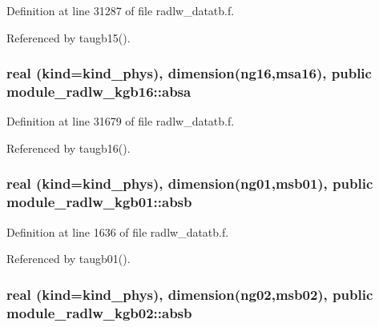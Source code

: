 Definition at line 31287 of file radlw\+\_\+datatb.\+f.



Referenced by taugb15().

\subsubsection[{\texorpdfstring{absa}{absa}}]{\setlength{\rightskip}{0pt plus 5cm}real (kind=kind\+\_\+phys), dimension(ng16,msa16), public module\+\_\+radlw\+\_\+kgb16\+::absa}\hypertarget{group__module__radlw__main_ga2734b420b7e8e8393a8bf1b595a3cf09}{}\label{group__module__radlw__main_ga2734b420b7e8e8393a8bf1b595a3cf09}


Definition at line 31679 of file radlw\+\_\+datatb.\+f.



Referenced by taugb16().

\subsubsection[{\texorpdfstring{absb}{absb}}]{\setlength{\rightskip}{0pt plus 5cm}real (kind=kind\+\_\+phys), dimension(ng01,msb01), public module\+\_\+radlw\+\_\+kgb01\+::absb}\hypertarget{group__module__radlw__main_gabdaefe1c38d8bfcac5ef9b878fac77cb}{}\label{group__module__radlw__main_gabdaefe1c38d8bfcac5ef9b878fac77cb}


Definition at line 1636 of file radlw\+\_\+datatb.\+f.



Referenced by taugb01().

\subsubsection[{\texorpdfstring{absb}{absb}}]{\setlength{\rightskip}{0pt plus 5cm}real (kind=kind\+\_\+phys), dimension(ng02,msb02), public module\+\_\+radlw\+\_\+kgb02\+::absb}\hypertarget{group__module__radlw__main_gacf34f9255586c9ed5ac5370db5b63c14}{}\label{group__module__radlw__main_gacf34f9255586c9ed5ac5370db5b63c14}


